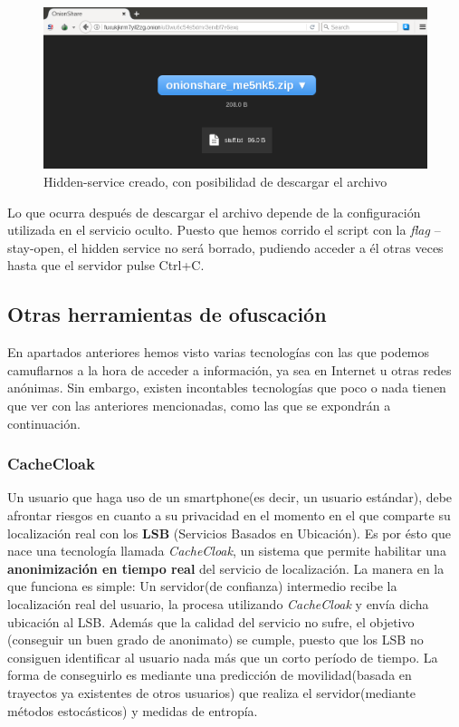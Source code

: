 \begin{figure}[h]
	\centerline{
		\mbox{\includegraphics[width=5.00in]{images/onionshare2.png}}
	}
	\caption{Hidden-service creado, con posibilidad de descargar el archivo}
	\label{fig:norm_Daugman}
\end{figure} 

Lo que ocurra después de descargar el archivo depende de la configuración utilizada en el servicio oculto. Puesto que hemos corrido el script con la \textit{flag } --stay-open, el hidden service no será borrado, pudiendo acceder a él otras veces hasta que el servidor pulse Ctrl+C.

\subsection{Otras herramientas de ofuscación}

En apartados anteriores hemos visto varias tecnologías con las que
podemos camuflarnos a la hora de acceder a información, ya sea en
Internet u otras redes anónimas. Sin embargo, existen incontables
tecnologías que poco o nada tienen que ver con las anteriores
mencionadas, como las que se expondrán a continuación.

\subsubsection{CacheCloak}

Un usuario que haga uso de un smartphone(es decir, un usuario
estándar), debe afrontar riesgos en cuanto a su privacidad en el
momento en el que comparte su localización real con los \textbf{LSB}
(Servicios Basados en Ubicación).  Es por ésto que nace una tecnología
llamada \textit{CacheCloak}, un sistema que permite habilitar una
\textbf{anonimización en tiempo real} del servicio de localización.
La manera en la que funciona es simple: Un servidor(de confianza)
intermedio recibe la localización real del usuario, la procesa
utilizando \textit{CacheCloak} y envía dicha ubicación al LSB.  Además
que la calidad del servicio no sufre, el objetivo (conseguir un buen
grado de anonimato) se cumple, puesto que los LSB no consiguen
identificar al usuario nada más que un corto período de tiempo.  La
forma de conseguirlo es mediante una predicción de movilidad(basada en
trayectos ya existentes de otros usuarios) que realiza el
servidor(mediante métodos estocásticos) y medidas de entropía.

